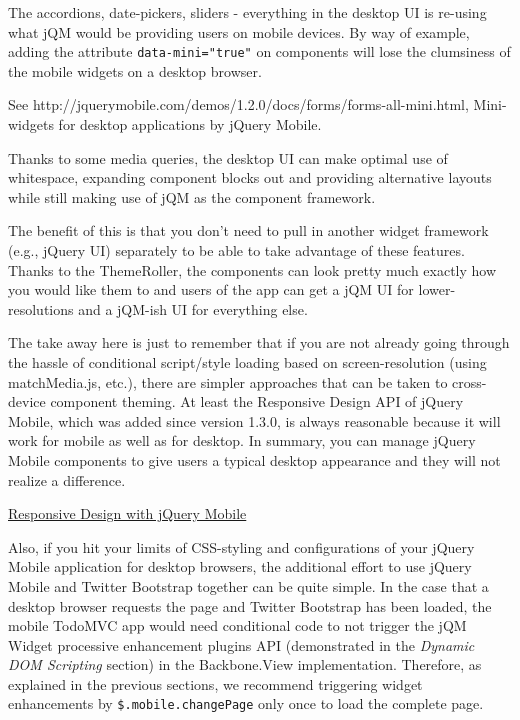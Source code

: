 \documentclass[9pt]{book}
\begin{document}
The accordions, date-pickers, sliders - everything in the desktop UI is
re-using what jQM would be providing users on mobile devices. By way of
example, adding the attribute \texttt{data-mini="true"} on components
will lose the clumsiness of the mobile widgets on a desktop browser.

See http://jquerymobile.com/demos/1.2.0/docs/forms/forms-all-mini.html,
Mini-widgets for desktop applications by jQuery Mobile.

Thanks to some media queries, the desktop UI can make optimal use of
whitespace, expanding component blocks out and providing alternative
layouts while still making use of jQM as the component framework.

The benefit of this is that you don't need to pull in another widget
framework (e.g., jQuery UI) separately to be able to take advantage of
these features. Thanks to the ThemeRoller, the components can look
pretty much exactly how you would like them to and users of the app can
get a jQM UI for lower-resolutions and a jQM-ish UI for everything else.

The take away here is just to remember that if you are not already going
through the hassle of conditional script/style loading based on
screen-resolution (using matchMedia.js, etc.), there are simpler
approaches that can be taken to cross-device component theming. At least
the Responsive Design API of jQuery Mobile, which was added since
version 1.3.0, is always reasonable because it will work for mobile as
well as for desktop. In summary, you can manage jQuery Mobile components
to give users a typical desktop appearance and they will not realize a
difference.

\href{http://view.jquerymobile.com/1.3.0/docs/intro/rwd.php}{Responsive
Design with jQuery Mobile}

Also, if you hit your limits of CSS-styling and configurations of your
jQuery Mobile application for desktop browsers, the additional effort to
use jQuery Mobile and Twitter Bootstrap together can be quite simple. In
the case that a desktop browser requests the page and Twitter Bootstrap
has been loaded, the mobile TodoMVC app would need conditional code to
not trigger the jQM Widget processive enhancement plugins API
(demonstrated in the \emph{Dynamic DOM Scripting} section) in the
Backbone.View implementation. Therefore, as explained in the previous
sections, we recommend triggering widget enhancements by
\texttt{\$.mobile.changePage} only once to load the complete page.
\end{document}
